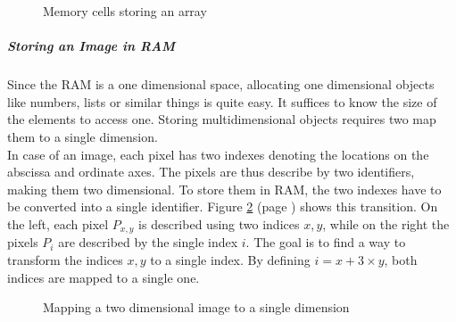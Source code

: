 \documentclass[10pt,a4paper,titlepage]{article}
\begin{document}
	\begin{figure}
		\centering
		\caption{Memory cells storing an array}
		\label{fig:memory_cells3}
	\end{figure}

	\subparagraph{Storing an Image in RAM}
	Since the RAM is a one dimensional space, allocating one dimensional objects like numbers, lists or similar things is quite easy. It suffices to know the size of the elements to access one. Storing multidimensional objects requires two map them to a single dimension.\\
	In case of an image, each pixel has two indexes denoting the locations on the abscissa and ordinate axes. The pixels are thus describe by two identifiers, making them two dimensional. To store them in RAM, the two indexes have to be converted into a single identifier. Figure \ref{fig:2d_to_1d} (page \pageref{fig:2d_to_1d}) shows this transition. On the left, each pixel \(P_{x,y}\) is described using two indices \(x, y\), while on the right the pixels \(P_{i}\) are described by the single index \(i\). The goal is to find a way to transform the indices \(x, y\) to a single index. By defining \(i = x + 3 \times y\), both indices are mapped to a single one.
	
	\begin{figure}
		\centering
		\caption{Mapping a two dimensional image to a single dimension}
		\label{fig:2d_to_1d}
	\end{figure}
	
\end{document}
